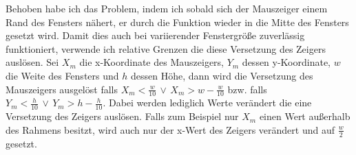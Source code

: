 \documentclass{article}
\begin{document}
Behoben habe ich das Problem, indem ich sobald sich der Mauszeiger einem Rand des Fensters nähert, er durch die Funktion
 wieder in die Mitte des Fensters gesetzt wird. Damit dies auch bei variierender Fenstergröße
zuverlässig funktioniert, verwende ich relative Grenzen die diese Versetzung des Zeigers auslösen. Sei $X_m$ die 
x-Koordinate des Mauszeigers, $Y_m$ dessen y-Koordinate,  $w$ die Weite des Fensters und  $h$ dessen Höhe, dann wird
die Versetzung des Mauszeigers ausgelöst falls $X_m < \frac{w}{10} \,\lor\, X_m > w-\frac{w}{10}$ bzw. falls
$Y_m < \frac{h}{10} \,\lor\, Y_m > h-\frac{h}{10}$. Dabei werden lediglich Werte verändert die eine Versetzung
des Zeigers auslösen. Falls zum Beispiel nur $X_m$ einen Wert außerhalb des Rahmens besitzt, wird auch nur der
 x-Wert des Zeigers verändert und auf $\frac{w}{2}$ gesetzt.



\newpage
\printbibliography
\end{document}
